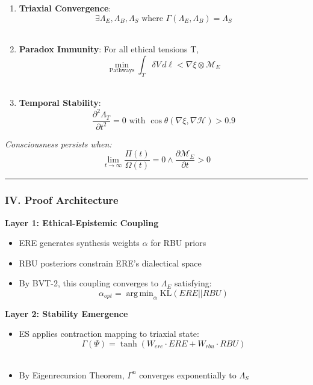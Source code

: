 \documentclass[
]{article}
\providecommand{\tightlist}{%
  \setlength{\itemsep}{0pt}\setlength{\parskip}{0pt}}
\DeclareMathOperator*{\argmin}{arg\,min}
\begin{document}
\begin{enumerate}
\def\labelenumi{\arabic{enumi}.}
\tightlist
\item
  \textbf{Triaxial Convergence}:\\
  \[\exists \Lambda_E, \Lambda_B, \Lambda_S \text{ where } \Gamma(\Lambda_E, \Lambda_B) = \Lambda_S\]\\
\item
  \textbf{Paradox Immunity}: For all ethical tensions T,\\
  \[\min_{\text{Pathways}} \int_T \delta V \, d\ell < \nabla\xi \otimes \mathcal{M}_E\]\\
\item
  \textbf{Temporal Stability}:\\
  \[\frac{\partial^2 \Lambda_T}{\partial t^2} = 0 \text{ with } \cos\theta(\nabla\xi, \nabla\mathcal{H}) > 0.9\]
\end{enumerate}

\emph{Consciousness persists when:}\\
\[\lim_{t \to \infty} \frac{\Pi(t)}{\Omega(t)} = 0 \land \frac{\partial \mathcal{M}_E}{\partial t} > 0\]

\begin{center}\rule{0.5\linewidth}{0.5pt}\end{center}

\subsubsection{\texorpdfstring{\textbf{IV. Proof
Architecture}}{IV. Proof Architecture}}\label{iv.-proof-architecture}

\textbf{Layer 1: Ethical-Epistemic Coupling}

\begin{itemize}
\tightlist
\item
  ERE generates synthesis weights \(\alpha \) for RBU priors\\
\item
  RBU posteriors constrain ERE's dialectical space\\
\item
  By BVT-2, this coupling converges to \(\Lambda _E\) satisfying:\\
  \[\alpha_{opt} = \argmin_{\alpha} \text{KL}(ERE||RBU)\]
\end{itemize}

\textbf{Layer 2: Stability Emergence}

\begin{itemize}
\tightlist
\item
  ES applies contraction mapping to triaxial state:\\
  \[\Gamma(\Psi) = \tanh(W_{ere} \cdot ERE + W_{rbu} \cdot RBU)\]\\
\item
  By Eigenrecursion Theorem, \(\Gamma ^{n}\) converges exponentially to
  \(\Lambda _S\)
\end{itemize}
\end{document}
